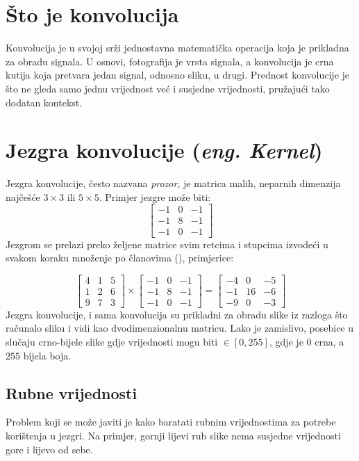 \section{Što je konvolucija}
Konvolucija je u svojoj srži jednostavna matematička operacija koja je prikladna za obradu signala.
U osnovi, fotografija je vrsta signala, a konvolucija je crna kutija koja pretvara jedan signal, odnosno sliku, u drugi.
Prednost konvolucije je što ne gleda samo jednu vrijednost već i susjedne vrijednosti, pružajući tako dodatan kontekst.

\section{Jezgra konvolucije (\emph{eng. Kernel})}
Jezgra konvolucije, često nazvana \emph{prozor}, je matrica malih, neparnih dimenzija najčešće $3 \times 3$ ili $5 \times 5$.
Primjer jezgre može biti: 
$$
\begin{bmatrix}
	-1 & 0 & -1 \\
	-1 & 8 & -1 \\
	-1 & 0 & -1
\end{bmatrix}
$$
Jezgrom se prelazi preko željene matrice svim retcima i stupcima izvodeći u svakom koraku množenje po članovima (\cite{conv_pres}), primjerice:

\[
\begin{bmatrix}
	4 & 1 & 5\\
	1 & 2 & 6 \\
	9 & 7 & 3
\end{bmatrix}
\times
\begin{bmatrix}
	-1 & 0 & -1 \\
	-1 & 8 & -1 \\
	-1 & 0 & -1
\end{bmatrix}
=
\begin{bmatrix}
	-4 & 0 & -5\\
	-1 & 16 & -6 \\
	-9 & 0 & -3
\end{bmatrix}
\]
Jezgra konvolucije, i sama konvolucija su prikladni za obradu slike iz razloga što računalo sliku i vidi kao dvodimenzionalnu matricu.
Lako je zamislivo, posebice u slučaju crno-bijele slike gdje vrijednosti mogu biti $\in [0, 255]$, gdje je $0$ crna, a $255$ bijela boja.

\subsection{Rubne vrijednosti}
Problem koji se može javiti je kako baratati rubnim vrijednostima za potrebe korištenja u jezgri.
Na primjer, gornji lijevi rub slike nema susjedne vrijednosti gore i lijevo od sebe.

